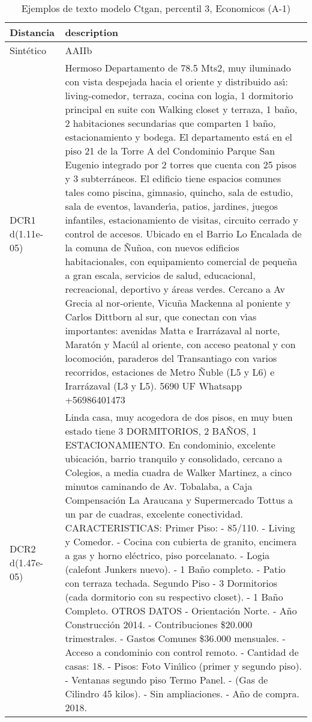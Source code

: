 \begin{table}[H]
\centering
\fontsize{10}{14}\selectfont
\caption{Ejemplos de texto modelo Ctgan, percentil 3, Economicos (A-1)}
\label{table-example-economicos-a-1-ctgan-3p-text}
\begin{tabular}{|l|m{35em}|}
\hline
\rowcolor[gray]{0.8}
Distancia & description \\
\hline Sintético & AAIIb \\
\hline DCR1 d(1.11e-05) & Hermoso Departamento de 78.5 Mts2, muy iluminado con vista despejada hacia el oriente y distribuido as{\'\i}: living-comedor, terraza, cocina con logia, 1 dormitorio principal en suite con Walking closet y terraza, 1 ba\~no, 2 habitaciones secundarias que comparten 1 ba\~no, estacionamiento y bodega. El departamento est\'a en el piso 21 de la Torre A del Condominio Parque San Eugenio integrado por 2 torres que cuenta con 25 pisos y 3 subterr\'aneos.  El edificio tiene espacios comunes tales como piscina, gimnasio, quincho, sala de estudio, sala de eventos, lavander{\'\i}a, patios, jardines, juegos infantiles, estacionamiento de visitas, circuito cerrado y control de accesos. Ubicado en el Barrio Lo Encalada de la comuna de \~Nu\~noa, con nuevos edificios habitacionales, con equipamiento comercial de peque\~na a gran escala, servicios de salud, educacional, recreacional, deportivo y \'areas verdes. Cercano a Av Grecia al nor-oriente, Vicu\~na Mackenna al poniente y Carlos Dittborn al sur, que conectan con v{\'\i}as importantes: avenidas Matta e Irarr\'azaval al norte, Marat\'on y Mac\'ul al oriente, con acceso peatonal y con locomoci\'on, paraderos del Transantiago con varios recorridos, estaciones de Metro \~Nuble (L5 y L6) e Irarr\'azaval (L3 y L5).  5690 UF Whatsapp +56986401473 \\
\hline DCR2 d(1.47e-05) & Linda casa, muy acogedora de dos pisos, en muy buen estado tiene 3 DORMITORIOS, 2 BA\~NOS, 1 ESTACIONAMIENTO. En condominio, excelente ubicaci\'on, barrio tranquilo y consolidado, cercano a Colegios, a media cuadra de Walker Martinez, a cinco minutos caminando de Av. Tobalaba, a Caja Compensaci\'on La Araucana y Supermercado Tottus a un par de cuadras, excelente conectividad.   CARACTERISTICAS:  Primer Piso: - 85/110. - Living y Comedor. - Cocina con cubierta de granito, encimera a gas y horno el\'ectrico, piso porcelanato. - Logia (calefont Junkers nuevo). - 1 Ba\~no completo. - Patio con terraza techada.  Segundo Piso - 3 Dormitorios (cada dormitorio con su respectivo closet). - 1 Ba\~no Completo.  OTROS DATOS - Orientaci\'on Norte. - A\~no Construcci\'on 2014. - Contribuciones \$20.000 trimestrales. - Gastos Comunes \$36.000 mensuales. - Acceso a condominio con control remoto. - Cantidad de casas: 18. - Pisos: Foto Vin{\'\i}lico (primer y segundo piso). - Ventanas segundo piso Termo Panel. - (Gas de Cilindro 45 kilos). - Sin ampliaciones. - A\~no de compra. 2018. \\
\hline
\end{tabular}
\end{table}
